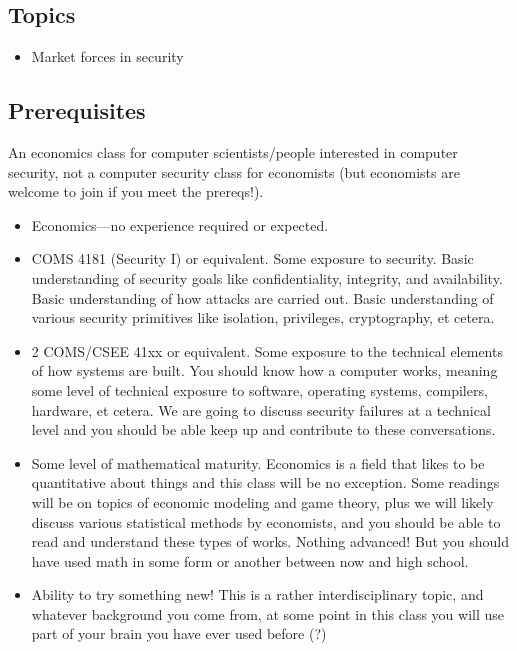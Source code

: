 \documentclass[11pt]{article}
\begin{document}
\subsection{Topics}
\begin{itemize}
    \item Market forces in security
\end{itemize}

\subsection{Prerequisites}

An economics class for computer scientists/people interested in computer security, not a computer security class for economists
(but economists are welcome to join if you meet the prereqs!).

\begin{itemize}
    \item Economics---no experience required or expected.
    \item COMS 4181 (Security I) or equivalent. Some exposure to security. Basic understanding of security goals like confidentiality, integrity, and availability. Basic understanding of how attacks are carried out. Basic understanding of various security primitives like isolation, privileges, cryptography, et cetera. 
    \item 2 COMS/CSEE 41xx or equivalent. Some exposure to the technical elements of how systems are built. You should know how a computer works, meaning some level of technical exposure to software, operating systems, compilers, hardware, et cetera. We are going to discuss security failures at a technical level and you should be able keep up and contribute to these conversations.
    \item Some level of mathematical maturity. Economics is a field that likes to be quantitative about things and this class will be no exception. Some readings will be on topics of economic modeling and game theory, plus we will likely discuss various statistical methods by economists, and you should be able to read and understand these types of works. Nothing advanced! But you should have used math in some form or another between now and high school. 
    \item Ability to try something new! This is a rather interdisciplinary topic, and whatever background you come from, at some point in this class you will use part of your brain you have ever used before (?)
\end{itemize}
\end{document}
